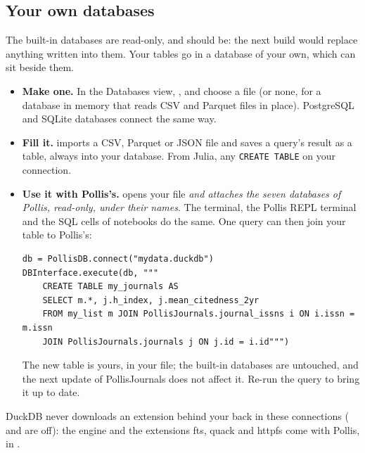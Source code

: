 \subsection{Your own databases}
The built-in databases are read-only, and should be: the next build would replace anything written into them. Your
tables go in a database of your own, which can sit beside them.
\begin{itemize}
  \item \textbf{Make one.} In the Databases view, , and choose a file (or none, for a
    database in memory that reads CSV and Parquet files in place). PostgreSQL and SQLite databases connect the same
    way.
  \item \textbf{Fill it.}  imports a CSV, Parquet
    or JSON file and saves a query's result as a table, always into your database. From Julia, any \texttt{\small CREATE TABLE}
    on your connection.
  \item \textbf{Use it with Pollis's.}  opens your file \emph{and attaches the seven
    databases of Pollis, read-only, under their names}. The  terminal, the Pollis REPL terminal and the SQL
    cells of notebooks do the same.
    One query can then join your table to Pollis's:
\begin{lstlisting}
db = PollisDB.connect("mydata.duckdb")
DBInterface.execute(db, """
	CREATE TABLE my_journals AS
	SELECT m.*, j.h_index, j.mean_citedness_2yr
	FROM my_list m JOIN PollisJournals.journal_issns i ON i.issn = m.issn
	JOIN PollisJournals.journals j ON j.id = i.id""")
\end{lstlisting}
    The new table is yours, in your file; the built-in databases are untouched, and the next update of PollisJournals
    does not affect it. Re-run the query to bring it up to date.
\end{itemize}
DuckDB never downloads an extension behind your back in these connections ( and
 are off): the engine and the extensions fts, quack and httpfs come with Pollis, in
.

